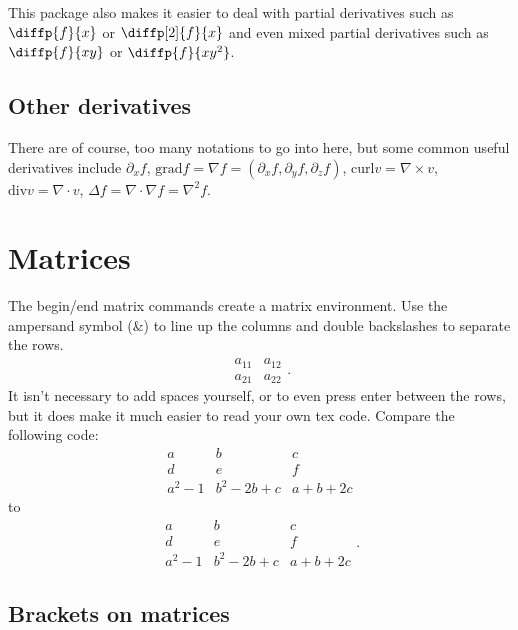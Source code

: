 \documentclass[a4paper,11pt]{article}
\begin{document}
This package also makes it easier to deal with partial derivatives such as $\diffp{f}{x}$ or $\diffp[2]{f}{x}$ and even mixed partial derivatives such as $\diffp{f}{{x}{y}}$ or $\diffp{f}{{x}{y^2}}$.



\subsection{Other derivatives}

There are of course, too many notations to go into here, but some common useful derivatives include 
$\partial_x f$, 
$\mathrm{grad} f = \nabla f = (\partial_x f, \partial_y f, \partial_z f)$, 
$\mathrm{curl} v = \nabla \times v$, $\mathrm{div} v = \nabla \cdot v$, 
$\Delta f = \nabla \cdot \nabla f = \nabla^2 f$.

\pagebreak






\section{Matrices}

The begin/end matrix commands create a matrix environment. Use the ampersand symbol (\&) to line up the columns and double backslashes  to separate the rows. 
\[
\begin{matrix}
	a_{11} & a_{12} \\ %
 	a_{21} & a_{22}
\end{matrix}.
\]
It isn't necessary to add spaces yourself, or to even press enter between the rows, but it does make it much easier to read your own tex code. Compare the following code:
\[\begin{matrix}a&b&c\\d&e&f\\a^2-1&b^2-2b+c&a+b+2c\end{matrix}\] 	%
to 
\[
\begin{matrix}
	a      & b         & c        \\ 
 	d      & e         & f        \\
 	a^2-1  & b^2-2b+c  & a+b+2c 
\end{matrix}.								%
\]


\subsection{Brackets on matrices}
\end{document}
